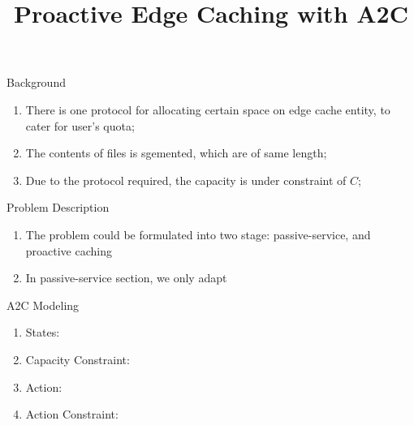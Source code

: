 \documentclass[a4paper,12pt]{article}
\title{Proactive Edge Caching with A2C}
\date{}
\begin{document}
\maketitle


\begin{section}{Background}
    \begin{enumerate}
        \item There is one protocol for allocating certain space on edge cache entity, to cater for user's quota;
        \item The contents of files is sgemented, which are of same length;
        \item Due to the protocol required, the capacity is under constraint of $C$;
    \end{enumerate}
\end{section}

\begin{section}{Problem Description}
    \begin{enumerate}
        \item The problem could be formulated into two stage: passive-service, and proactive caching
        \item In passive-service section, we only adapt 
    \end{enumerate}
\end{section}

\begin{section}{A2C Modeling}
    \begin{enumerate}
        \item States:
        \item Capacity Constraint:
        \item Action:
        \item Action Constraint:
    \end{enumerate}
\end{section}
\end{document}
